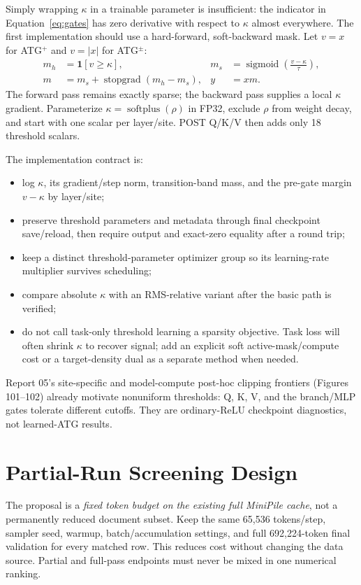 \documentclass[10pt]{article}
\newcommand{\tightsection}[1]{\section{#1}\vspace{-0.35em}}
\begin{document}
Simply wrapping $\kappa$ in a trainable parameter is insufficient: the indicator in Equation~\ref{eq:gates} has zero derivative with respect to $\kappa$ almost everywhere. The first implementation should use a hard-forward, soft-backward mask. Let $v=x$ for ATG$^+$ and $v=|x|$ for ATG$^{\pm}$:
\begin{align*}
m_h &= \mathbf{1}[v\geq\kappa],
&m_s &= \operatorname{sigmoid}\!\left(\frac{v-\kappa}{\tau}\right),\\
m &= m_s+\operatorname{stopgrad}(m_h-m_s),
&y &= xm.
\end{align*}
The forward pass remains exactly sparse; the backward pass supplies a local $\kappa$ gradient. Parameterize $\kappa=\operatorname{softplus}(\rho)$ in FP32, exclude $\rho$ from weight decay, and start with one scalar per layer/site. POST Q/K/V then adds only 18 threshold scalars.

The implementation contract is:
\begin{itemize}
\item log $\kappa$, its gradient/step norm, transition-band mass, and the pre-gate margin $v-\kappa$ by layer/site;
\item preserve threshold parameters and metadata through final checkpoint save/reload, then require output and exact-zero equality after a round trip;
\item keep a distinct threshold-parameter optimizer group so its learning-rate multiplier survives scheduling;
\item compare absolute $\kappa$ with an RMS-relative variant after the basic path is verified;
\item do not call task-only threshold learning a sparsity objective. Task loss will often shrink $\kappa$ to recover signal; add an explicit soft active-mask/compute cost or a target-density dual as a separate method when needed.
\end{itemize}

Report 05's site-specific and model-compute post-hoc clipping frontiers (Figures 101--102) already motivate nonuniform thresholds: Q, K, V, and the branch/MLP gates tolerate different cutoffs. They are ordinary-ReLU checkpoint diagnostics, not learned-ATG results.

\tightsection{Partial-Run Screening Design}

The proposal is a \emph{fixed token budget on the existing full MiniPile cache}, not a permanently reduced document subset. Keep the same 65,536 tokens/step, sampler seed, warmup, batch/accumulation settings, and full 692,224-token final validation for every matched row. This reduces cost without changing the data source. Partial and full-pass endpoints must never be mixed in one numerical ranking.
\end{document}
